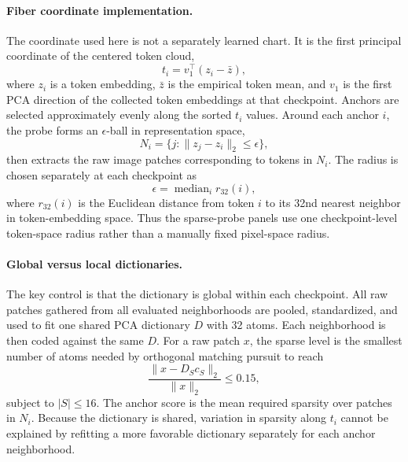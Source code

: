 \documentclass{article}
\begin{document}
\paragraph{Fiber coordinate implementation.}
The coordinate used here is not a separately learned chart. It is the first principal coordinate of the centered token cloud,
\begin{equation}
  t_i = v_1^\top (z_i - \bar z),
\end{equation}
where $z_i$ is a token embedding, $\bar z$ is the empirical token mean, and $v_1$ is the first PCA direction of the collected token embeddings at that checkpoint. Anchors are selected approximately evenly along the sorted $t_i$ values. Around each anchor $i$, the probe forms an $\epsilon$-ball in representation space,
\begin{equation}
  N_i = \{j : \lVert z_j - z_i \rVert_2 \le \epsilon\},
\end{equation}
then extracts the raw image patches corresponding to tokens in $N_i$. The radius is chosen separately at each checkpoint as
\begin{equation}
  \epsilon = \operatorname{median}_i r_{32}(i),
\end{equation}
where $r_{32}(i)$ is the Euclidean distance from token $i$ to its 32nd nearest neighbor in token-embedding space. Thus the sparse-probe panels use one checkpoint-level token-space radius rather than a manually fixed pixel-space radius.

\paragraph{Global versus local dictionaries.}
The key control is that the dictionary is global within each checkpoint. All raw patches gathered from all evaluated neighborhoods are pooled, standardized, and used to fit one shared PCA dictionary $D$ with 32 atoms. Each neighborhood is then coded against the same $D$. For a raw patch $x$, the sparse level is the smallest number of atoms needed by orthogonal matching pursuit to reach
\begin{equation}
  \frac{\lVert x - D_S c_S \rVert_2}{\lVert x \rVert_2} \le 0.15,
\end{equation}
subject to $|S|\le 16$. The anchor score is the mean required sparsity over patches in $N_i$. Because the dictionary is shared, variation in sparsity along $t_i$ cannot be explained by refitting a more favorable dictionary separately for each anchor neighborhood.
\end{document}

